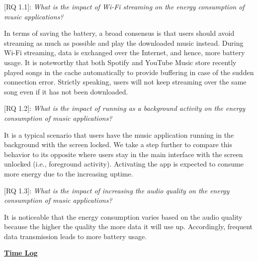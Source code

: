 [RQ 1.1]: \emph{What is the impact of Wi-Fi streaming on the energy consumption of music applications?}

In terms of saving the battery, a broad consensus is that users should avoid streaming as much as possible and play the downloaded music instead. During Wi-Fi streaming, data is exchanged over the Internet, and hence, more battery usage. It is noteworthy that both Spotify and YouTube Music store recently played songs in the cache automatically to provide buffering in case of the sudden connection error. Strictly speaking, users will not keep streaming over the same song even if it has not been downloaded.  

[RQ 1.2]: \emph{What is the impact of running as a background activity on the energy consumption of music applications?}

It is a typical scenario that users have the music application running in the background with the screen locked. We take a step further to compare this behavior to its opposite where users stay in the main interface with the screen unlocked (i.e., foreground activity). Activating the app is expected to consume more energy due to the increasing uptime.

[RQ 1.3]: \emph{What is the impact of increasing the audio quality on the energy consumption of music applications?}

 It is noticeable that the energy consumption varies based on the audio quality because the higher the quality the more data it will use up. Accordingly, frequent data transmission leads to more battery usage.  

\href{https://docs.google.com/spreadsheets/d/1w2QG47_3Y9-IXbPPSM2fw1bH0ZvWMfadzRdfwqmWBtI/edit?usp=sharing}{\textbf{Time Log}}



